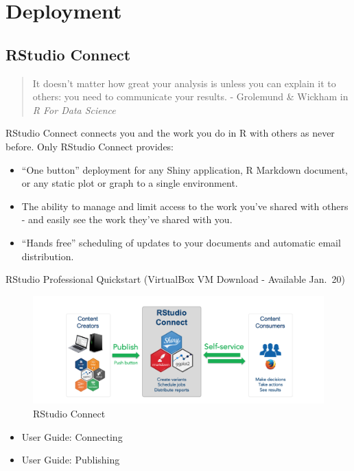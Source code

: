 \documentclass[]{book}
\providecommand{\tightlist}{%
  \setlength{\itemsep}{0pt}\setlength{\parskip}{0pt}}
\theoremstyle{definition}
\theoremstyle{definition}
\theoremstyle{definition}
\theoremstyle{remark}
\begin{document}
\hypertarget{deployment}{%
\chapter{Deployment}\label{deployment}}

\hypertarget{rstudio-connect}{%
\section{RStudio Connect}\label{rstudio-connect}}

\begin{quote}
It doesn't matter how great your analysis is unless you can explain it
to others: you need to communicate your results. - Grolemund \& Wickham
in \emph{R For Data Science}
\end{quote}

RStudio Connect connects you and the work you do in R with others as
never before. Only RStudio Connect provides:

\begin{itemize}
\tightlist
\item
  ``One button'' deployment for any Shiny application, R Markdown
  document, or any static plot or graph to a single environment.
\item
  The ability to manage and limit access to the work you've shared with
  others - and easily see the work they've shared with you.
\item
  ``Hands free'' scheduling of updates to your documents and automatic
  email distribution.
\end{itemize}

RStudio Professional Quickstart (VirtualBox VM Download - Available
Jan.~20)

\begin{figure}
\centering
\includegraphics{imgs/deployment/explain-connect.png}
\caption{RStudio Connect}
\end{figure}

\begin{itemize}
\tightlist
\item
  User Guide: Connecting
\item
  User Guide: Publishing
\end{itemize}
\end{document}
